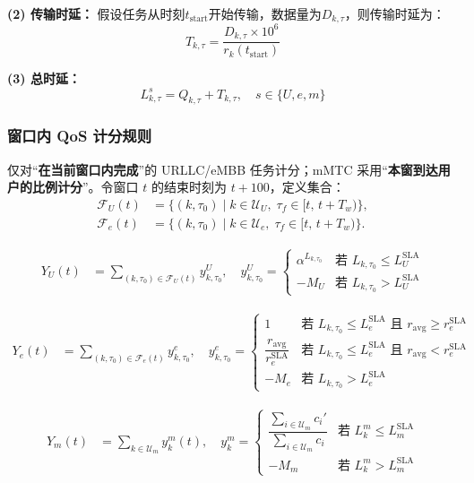 \textbf{(2) 传输时延：}
假设任务从时刻$t_{\text{start}}$开始传输，数据量为$D_{k,\tau}$，则传输时延为：
\begin{equation}
T_{k,\tau} = \frac{D_{k,\tau} \times 10^6}{r_k(t_{\text{start}})}
\end{equation}

\textbf{(3) 总时延：}
\begin{equation}
L_{k,\tau}^s = Q_{k,\tau} + T_{k,\tau}, \quad s \in \{U, e, m\}
\end{equation}


\subsubsection{窗口内 QoS 计分规则}
仅对“\textbf{在当前窗口内完成}”的 URLLC/eMBB 任务计分；mMTC 采用“\textbf{本窗到达用户的比例计分}”。令窗口 $t$ 的结束时刻为 $t+100$，定义集合：
\begin{align}
\mathcal{F}_U(t) &= \big\{(k,\tau_0)\mid k\in\mathcal{U}_U,\; \tau_f\in[t,\,t+T_w)\big\}, \\
\mathcal{F}_e(t) &= \big\{(k,\tau_0)\mid k\in\mathcal{U}_e,\; \tau_f\in[t,\,t+T_w)\big\}.
\end{align}

\begin{align}
Y_U(t) &= \sum_{(k,\tau_0)\in\mathcal{F}_U(t)} y_{k,\tau_0}^U, 
\quad y_{k,\tau_0}^U =\begin{cases}
\alpha^{L_{k,\tau_0}} & \text{若 } L_{k,\tau_0}\le L_U^{\text{SLA}} \\
-M_U & \text{若 } L_{k,\tau_0}> L_U^{\text{SLA}}
\end{cases}
\end{align}

\begin{align}
Y_e(t) &= \sum_{(k,\tau_0)\in\mathcal{F}_e(t)} y_{k,\tau_0}^e, 
\quad y_{k,\tau_0}^e =\begin{cases}
1 & \text{若 } L_{k,\tau_0}\le L_e^{\text{SLA}} \text{ 且 } r_{\mathrm{avg}}\ge r_e^{\text{SLA}} \\
\dfrac{r_{\mathrm{avg}}}{r_e^{\text{SLA}}} & \text{若 } L_{k,\tau_0}\le L_e^{\text{SLA}} \text{ 且 } r_{\mathrm{avg}}<r_e^{\text{SLA}} \\
-M_e & \text{若 } L_{k,\tau_0}> L_e^{\text{SLA}}
\end{cases}
\end{align}

\begin{align}
Y_m(t) &= \sum_{k \in \mathcal{U}_m} y_k^m(t), 
\quad y_k^m =\begin{cases}
\dfrac{\sum_{i \in \mathcal{U}_{m}} c_i'}{\sum_{i \in \mathcal{U}_{m}} c_i} & \text{若 } L_k^{m} \le L_{m}^{\text{SLA}} \\
-M_{m} & \text{若 } L_k^{m} > L_{m}^{\text{SLA}}
\end{cases}
\end{align}



